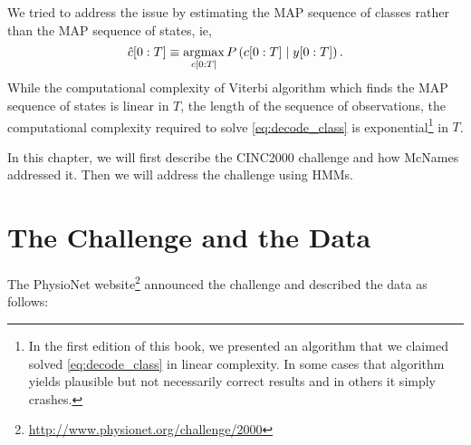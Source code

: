 We tried to address the issue by estimating the MAP sequence of classes
rather than the MAP sequence of states, ie,
\begin{equation}
  \label{eq:decode_class}
  \hat c[0:T] \equiv
  \operatorname*{argmax}_{c[0:T]}P\left(c[0:T] \mid  y[0:T]\right).
\end{equation}
While the computational complexity of Viterbi algorithm which finds
the MAP sequence of states is linear in $T$, the length of the
sequence of observations, the computational complexity required to
solve \eqref{eq:decode_class} is exponential\footnote{In the first
  edition of this book, we presented an algorithm that we claimed solved
  \eqref{eq:decode_class} in linear complexity.  In some cases that
  algorithm yields plausible but not necessarily correct results and
  in others it simply crashes.} in $T$.

In this chapter, we will first describe the CINC2000 challenge and how
McNames addressed it.  Then we will address the challenge using HMMs.

\section{The  Challenge and the Data}
\label{sec:challenge}

The PhysioNet
website\footnote{\url{http://www.physionet.org/challenge/2000}}
announced the challenge and described the data as follows:

